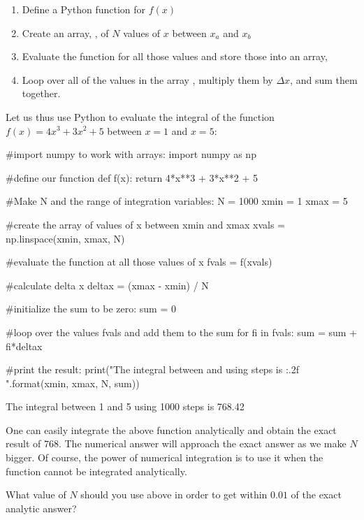 \begin{enumerate}
\item Define a Python function for $f(x)$
\item Create an array, , of $N$ values of $x$ between $x_a$ and $x_b$
\item Evaluate the function for all those values and store those into an array, 
\item Loop over all of the values in the array , multiply them by $\Delta x$, and sum them together.
\end{enumerate}
Let us thus use Python to evaluate the integral of the function $f(x)=4x^3+3x^2+5$ between $x=1$ and $x=5$:
\begin{python}[caption=Numerical integration of a function] 
#import numpy to work with arrays:
import numpy as np

#define our function
def f(x):
  return 4*x**3 + 3*x**2 + 5
  
#Make N and the range of integration variables:
N = 1000
xmin = 1
xmax = 5

#create the array of values of x between xmin and xmax
xvals = np.linspace(xmin, xmax, N)

#evaluate the function at all those values of x
fvals = f(xvals)

#calculate delta x
deltax = (xmax - xmin) / N

#initialize the sum to be zero:
sum = 0

#loop over the values fvals and add them to the sum
for fi in fvals:
  sum = sum + fi*deltax

#print the result:
print("The integral between {} and {} using {} steps is {:.2f} ".format(xmin, xmax, N, sum))

\end{python}
\begin{poutput}
The integral between 1 and 5 using 1000 steps is 768.42 
\end{poutput}
One can easily integrate the above function analytically and obtain the exact result of $\num{768}$. The numerical answer will approach the exact answer as we make $N$ bigger. Of course, the power of numerical integration is to use it when the function cannot be integrated analytically.

\begin{checkpointSA}{What value of $N$ should you use above in order to get within $\num{0.01}$ of the exact analytic answer?}
\end{checkpointSA}